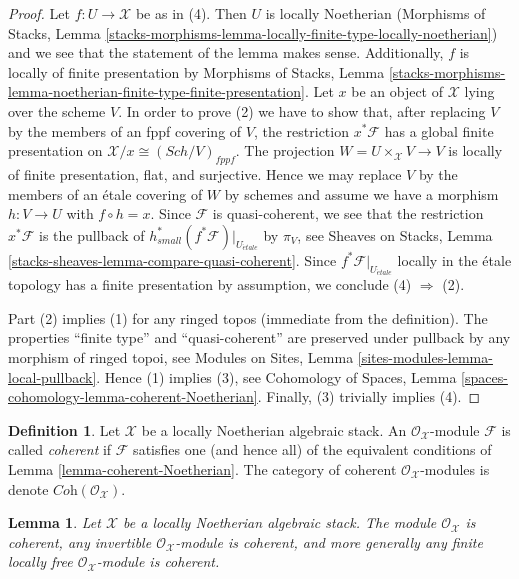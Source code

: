 \documentclass{stacks-project}
\theoremstyle{plain}
\newtheorem{lemma}[subsection]{Lemma}
\theoremstyle{definition}
\newtheorem{definition}[subsection]{Definition}
\theoremstyle{remark}
\numberwithin{equation}{subsection}
\def\Sch{\mathit{Sch}}
\def\etale{{\acute{e}tale}}
\begin{document}
\begin{proof}
Let $f : U \to \mathcal{X}$ be as in (4).
Then $U$ is locally Noetherian (Morphisms of Stacks, Lemma
\ref{stacks-morphisms-lemma-locally-finite-type-locally-noetherian})
and we see that the statement of the lemma makes sense. Additionally,
$f$ is locally of finite presentation by Morphisms of Stacks, Lemma
\ref{stacks-morphisms-lemma-noetherian-finite-type-finite-presentation}.
Let $x$ be an object of $\mathcal{X}$ lying over the scheme $V$.
In order to prove (2) we have to show that, after replacing $V$
by the members of an fppf covering of $V$, the restriction $x^*\mathcal{F}$
has a global finite presentation on $\mathcal{X}/x \cong (\Sch/V)_{fppf}$.
The projection $W = U \times_\mathcal{X} V \to V$ is
locally of finite presentation, flat, and surjective.
Hence we may replace $V$ by the members of an \'etale covering of $W$
by schemes and assume we have a morphism $h : V \to U$ with $f \circ h = x$.
Since $\mathcal{F}$ is quasi-coherent, we see that
the restriction $x^*\mathcal{F}$
is the pullback of $h_{small}^*(f^*\mathcal{F})|_{U_\etale}$
by $\pi_V$, see Sheaves on Stacks, Lemma
\ref{stacks-sheaves-lemma-compare-quasi-coherent}.
Since $f^*\mathcal{F}|_{U_\etale}$ locally in the
\'etale topology has a finite presentation by assumption, we conclude
(4) $\Rightarrow$ (2).

\medskip\noindent
Part (2) implies (1) for any ringed topos (immediate from the definition).
The properties ``finite type'' and ``quasi-coherent''
are preserved under pullback by any morphism of ringed topoi, see
Modules on Sites, Lemma \ref{sites-modules-lemma-local-pullback}.
Hence (1) implies (3), see Cohomology of Spaces, Lemma
\ref{spaces-cohomology-lemma-coherent-Noetherian}.
Finally, (3) trivially implies (4).
\end{proof}

\begin{definition}
\label{definition-coherent}
Let $\mathcal{X}$ be a locally Noetherian algebraic stack.
An $\mathcal{O}_\mathcal{X}$-module $\mathcal{F}$ is called {\it coherent}
if $\mathcal{F}$ satisfies one (and hence all) of the equivalent
conditions of Lemma \ref{lemma-coherent-Noetherian}.
The category of coherent $\mathcal{O}_\mathcal{X}$-modules is
denote $\textit{Coh}(\mathcal{O}_\mathcal{X})$.
\end{definition}

\begin{lemma}
\label{lemma-elementary-coherent}
Let $\mathcal{X}$ be a locally Noetherian algebraic stack.
The module $\mathcal{O}_\mathcal{X}$ is coherent, any invertible
$\mathcal{O}_\mathcal{X}$-module is coherent, and more generally any
finite locally free $\mathcal{O}_\mathcal{X}$-module is coherent.
\end{lemma}
\end{document}
